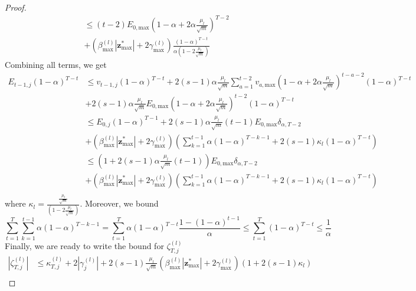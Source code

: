 \documentclass[10pt]{article} %
\newcommand{\z}{{\bm z}}
\begin{document}
\begin{proof}
\begin{equation}
\begin{aligned}
&\leq (t-2) E_{0, \text{max}} (1 - \alpha + 2 \alpha \frac{\mu_l}{\sqrt{m}})^{T - 2}\\
&+ (\beta_{\text{max}}^{(l)} | \z^{\ast}_{\text{max}} | + 2 \gamma_{\text{max}}^{(l)}) \frac{(1 - \alpha)^{T-t}}{\alpha (1 - 2\frac{\mu_l}{\sqrt{m}})}
\end{aligned}
\end{equation}
Combining all terms, we get
\begin{equation}\label{eq:Ealpha}
\begin{aligned}
E_{t-1, j} (1 - \alpha)^{T-t} &\leq v_{t-1, j} (1 - \alpha)^{T-t} + 2 (s-1) \alpha \frac{\mu_l}{\sqrt{m}} \sum_{a=1}^{t-2} v_{a, \text{max}} (1 - \alpha + 2 \alpha \frac{\mu_l}{\sqrt{m}})^{t - a - 2} (1 - \alpha)^{T-t}\\
&+ 2 (s-1) \alpha \frac{\mu_l}{\sqrt{m}} E_{0, \text{max}} (1 - \alpha + 2 \alpha \frac{\mu_l}{\sqrt{m}})^{t-2} (1 - \alpha)^{T-t}\\
&\leq E_{0, j} (1 - \alpha)^{T-1} + 2 (s-1) \alpha \frac{\mu_l}{\sqrt{m}} (t-1) E_{0, \text{max}} \delta_{\alpha, T-2}\\
&+ (\beta_{\text{max}}^{(l)} | \z^{\ast}_{\text{max}} | + 2 \gamma_{\text{max}}^{(l)}) \left( \sum_{k=1}^{t-1} \alpha (1 - \alpha)^{T-k-1} + 2 (s-1) \kappa_l (1 - \alpha)^{T-t} \right)\\
&\leq (1 + 2 (s-1) \alpha \frac{\mu_l}{\sqrt{m}} (t-1)) E_{0, \text{max}} \delta_{\alpha, T-2}\\
&+ (\beta_{\text{max}}^{(l)} | \z^{\ast}_{\text{max}} | + 2 \gamma_{\text{max}}^{(l)}) \left( \sum_{k=1}^{t-1} \alpha (1 - \alpha)^{T-k-1} + 2 (s-1) \kappa_l (1 - \alpha)^{T-t} \right)\\
\end{aligned}
\end{equation}
where $\kappa_l = \frac{\frac{\mu_l}{\sqrt{m}}}{ (1 - 2\frac{\mu_l}{\sqrt{m}})}$. Moreover, we bound
\begin{equation}
\sum_{t=1}^T \sum_{k=1}^{t-1} \alpha (1 - \alpha)^{T-k-1} = \sum_{t=1}^T \alpha (1 - \alpha)^{T-t} \frac{1 - (1-\alpha)^{t-1}}{\alpha}
\leq \sum_{t=1}^T (1 - \alpha)^{T-t} \leq \frac{1}{\alpha}
\end{equation}
Finally, we are ready to write the bound for $\zeta_{T,j}^{(l)}$
\begin{equation}
\begin{aligned}
| \zeta _{T,j}^{(l)} | &\leq \kappa_{T,j}^{(l)} + 2| \gamma_j^{(l)} | + 2 (s-1) \frac{\mu_l}{\sqrt{m}} (\beta_{\text{max}}^{(l)} | \z^{\ast}_{\text{max}} | + 2 \gamma_{\text{max}}^{(l)}) ( 1 + 2 (s-1) \kappa_l)\\

\end{aligned}
\end{equation}
\end{proof}
\end{document}
